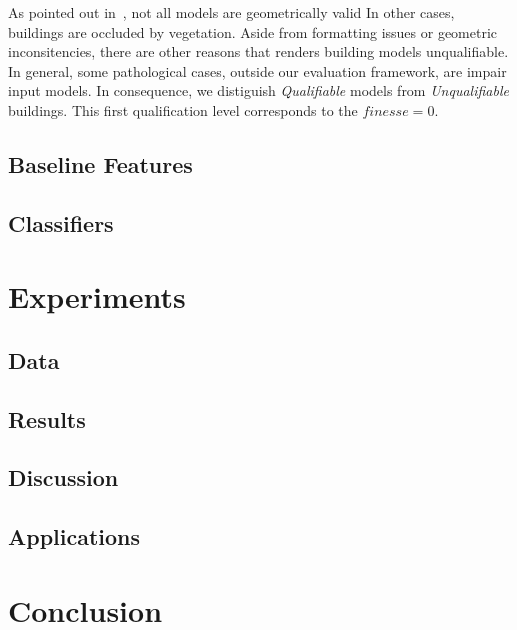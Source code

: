 \documentclass[runningheads]{llncs}
\begin{document}
As pointed out in~\cite{ledoux2018val3dity}, not all models are geometrically valid In other cases, buildings are occluded by vegetation. Aside from formatting issues or geometric inconsitencies, there are other reasons that renders building models unqualifiable. In general, some pathological cases, outside our evaluation framework, are impair input models. In consequence, we distiguish \textit{Qualifiable} models from \textit{Unqualifiable} buildings. This first qualification level corresponds to the $\textit{finesse} = 0$. 
\subsection{Baseline Features}
\subsection{Classifiers}
\section{Experiments}
\subsection{Data}
\subsection{Results}
\subsection{Discussion}
\subsection{Applications}
\section{Conclusion}



\end{document}
